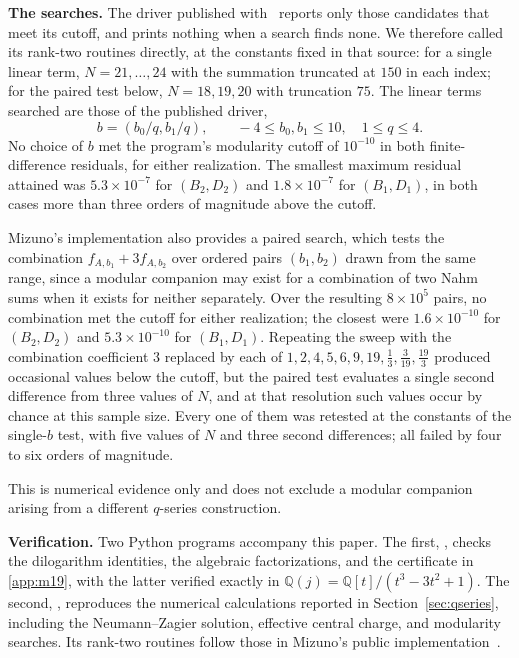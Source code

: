 \documentclass[preprint,12pt,number]{elsarticle}
\theoremstyle{remark}
\begin{document}
\medskip
\noindent\textbf{The searches.}
The driver published with~\cite{MizunoCode} reports only those candidates that
meet its cutoff, and prints nothing when a search finds none.  We therefore
called its rank-two routines directly, at the constants fixed in that source:
for a single linear term, $N=21,\ldots,24$ with the summation truncated at
$150$ in each index; for the paired test below, $N=18,19,20$ with truncation
$75$.  The linear terms searched are those of the published driver,
\[
b=(b_0/q,b_1/q),\qquad -4\le b_0,b_1\le10,\quad 1\le q\le4 .
\]
No choice of $b$ met the program's modularity cutoff of $10^{-10}$ in both
finite-difference residuals, for either realization.  The smallest maximum
residual attained was $5.3\times10^{-7}$ for $(B_2,D_2)$ and
$1.8\times10^{-7}$ for $(B_1,D_1)$, in both cases more than three orders of
magnitude above the cutoff.

Mizuno's implementation also provides a paired search, which tests the
combination $f_{A,b_1}+3f_{A,b_2}$ over ordered pairs $(b_1,b_2)$ drawn
from the same range, since a modular companion may exist for a combination
of two Nahm sums when it exists for neither separately.  Over the
resulting $8\times10^5$ pairs, no combination met the cutoff for either
realization; the closest were $1.6\times10^{-10}$ for $(B_2,D_2)$ and
$5.3\times10^{-10}$ for $(B_1,D_1)$.  Repeating the sweep with the
combination coefficient $3$ replaced by each of
$1,2,4,5,6,9,19,\tfrac13,\tfrac{3}{19},\tfrac{19}{3}$ produced occasional
values below the cutoff, but the paired test evaluates a single second
difference from three values of $N$, and at that resolution such values
occur by chance at this sample size.  Every one of them was retested at
the constants of the single-$b$ test, with five values of $N$ and three
second differences; all failed by four to six orders of magnitude.

\medskip
\noindent This is numerical evidence only and does not exclude a modular
companion arising from a different $q$-series construction.

\medskip
\noindent\textbf{Verification.}
Two Python programs accompany this paper. The first,
, checks the dilogarithm identities,
the algebraic factorizations, and the certificate in
\ref{app:m19}, with the latter verified exactly in
$\mathbb{Q}(j)=\mathbb{Q}[t]/(t^3-3t^2+1)$. The second,
, reproduces the numerical calculations
reported in Section~\ref{sec:qseries}, including the Neumann--Zagier solution,
effective central charge, and modularity searches. Its rank-two routines
follow those in Mizuno's public implementation~\cite{MizunoCode}.
\end{document}
